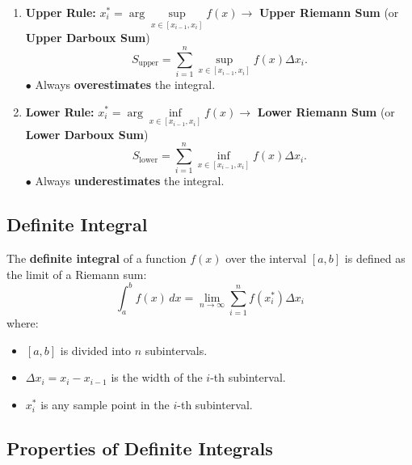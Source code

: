 \documentclass[a4paper,11pt]{article}
\begin{document}
\begin{tcolorbox}[breakable]
\begin{enumerate}
        \item \textbf{Upper Rule:} $x_i^* = \arg\sup\limits_{x \in [x_{i-1}, x_i]} f(x) \rightarrow$ \textbf{Upper Riemann Sum} (or \textbf{Upper Darboux Sum})
        \[
        S_{\text{upper}} = \sum_{i=1}^n \sup\limits_{x \in [x_{i-1}, x_i]} f(x) \Delta x_i.
        \]
        $\bullet$ Always \textbf{overestimates} the integral.

        \pagebreak
        
        \item \textbf{Lower Rule:} $x_i^* = \arg\inf\limits_{x \in [x_{i-1}, x_i]} f(x) \rightarrow$ \textbf{Lower Riemann Sum} (or \textbf{Lower Darboux Sum})
        \[
        S_{\text{lower}} = \sum_{i=1}^n \inf\limits_{x \in [x_{i-1}, x_i]} f(x) \Delta x_i.
        \]
        $\bullet$ Always \textbf{underestimates} the integral.
    \end{enumerate}
\end{tcolorbox}




\subsection{Definite Integral}

\begin{tcolorbox}
    The \textbf{definite integral} of a function $f(x)$ over the interval $[a,b]$ is defined as the limit of a Riemann sum:
    \[
    \int_{a}^{b} f(x) \, dx = \lim_{n \to \infty} \sum_{i=1}^n f(x_i^*) \Delta x_i
    \]
    where:
    \begin{itemize}
        \item $[a,b]$ is divided into $n$ subintervals.
        \item $\Delta x_i = x_i - x_{i-1}$ is the width of the $i$-th subinterval.
        \item $x_i^*$ is any sample point in the $i$-th subinterval.
    \end{itemize}
\end{tcolorbox}
\pagebreak




\subsection{Properties of Definite Integrals}
\end{document}
